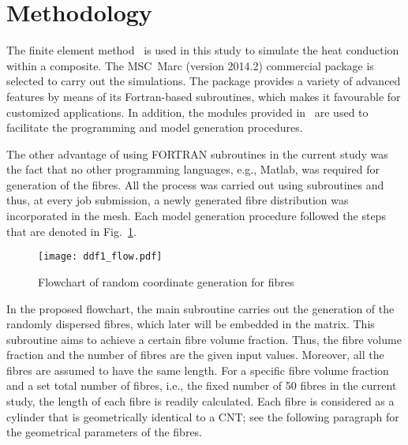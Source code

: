 \section{Methodology}
	The finite element method~\autocite{Ochsner.2013,Oechsner.2016} is used in this study to simulate the heat conduction within a composite. The MSC~Marc (version 2014.2) commercial package is selected to carry out the simulations. The package provides a variety of advanced features by means of its Fortran-based subroutines, which makes it favourable for customized applications. In addition, the modules provided in~\autocite{Javanbakht.2017} are used to facilitate the programming and model generation procedures.

	The other advantage of using FORTRAN subroutines in the current study was the fact that no other programming languages, e.g., Matlab, was required for generation of the fibres. All the process was carried out using subroutines and thus, at every job submission, a newly generated fibre distribution was incorporated in the mesh. Each model generation procedure followed the steps that are denoted in Fig.~\ref{figure:flowchart}.

	\begin{figure}[!h]
	\centering
	\texttt{[image: ddf1\_flow.pdf]}
	\caption{Flowchart of random coordinate generation for fibres}\label{figure:flowchart}
	\end{figure}
	
	\red In the proposed flowchart, the main  subroutine carries out the generation of the randomly dispersed fibres, which later will be embedded in the matrix. This subroutine aims to achieve a certain fibre volume fraction. Thus, the fibre volume fraction and the number of fibres are the given input values. Moreover, all the fibres are assumed to have the same length. For a specific fibre volume fraction and a set total number of fibres, i.e., the fixed number of 50 fibres in the current study, the length of each fibre is readily calculated. Each fibre is considered as a cylinder that is geometrically identical to a CNT; see the following paragraph for the geometrical parameters of the fibres. 
	
